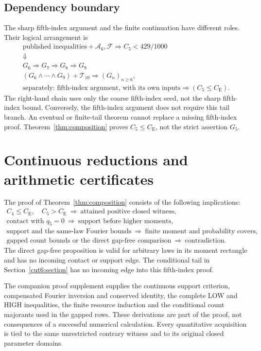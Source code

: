 \documentclass[11pt,a4paper]{article}
\theoremstyle{definition}
\newcommand{\CE}{C_{\mathrm E}}
\begin{document}
\subsection*{Dependency boundary}
The sharp fifth-index argument and the finite continuation have different
roles. Their logical arrangement is
\[
\begin{gathered}
\text{published inequalities}+\mathcal A_6,\mathcal F
 \Longrightarrow C_5<429/1000\\
\Downarrow\\[-2pt]
G_6\Longrightarrow G_7\Longrightarrow G_8\Longrightarrow G_9\\[3pt]
(G_6\wedge\cdots\wedge G_9)+\mathcal T_{10}
 \Longrightarrow (G_n)_{n\ge6},\\[3pt]
\text{separately: fifth-index argument, with its own inputs}
 \Longrightarrow (C_5\le\CE).
\end{gathered}
\]
The right-hand chain uses only the coarse fifth-index seed, not the sharp
fifth-index bound.
Conversely, the fifth-index argument does not require this tail branch.
An eventual or finite-tail theorem cannot replace a missing fifth-index
proof. Theorem~\ref{thm:composition} proves \(C_5\le\CE\), not
the strict assertion \(G_5\).


\section{Continuous reductions and arithmetic certificates}\label{sec:sources}
The proof of Theorem~\ref{thm:composition} consists of the following
implications:
\[
\begin{gathered}
 C_4\le\CE,\quad C_5>\CE
 \ \Longrightarrow\ \text{attained positive closed witness},\\
 \text{contact with }q_5=0
 \ \Longrightarrow\ \text{support before higher moments},\\
 \text{support and the same-law Fourier bounds}
 \ \Longrightarrow\ \text{finite moment and probability covers},\\
 \text{gapped count bounds or the direct gap-free comparison}
 \ \Longrightarrow\ \text{contradiction}.
\end{gathered}
\]
The direct gap-free proposition is valid for arbitrary laws in its
moment rectangle and has no incoming contact or support edge.
The conditional tail in Section~\ref{cut6:section} has no incoming edge
into this fifth-index proof.

The companion proof supplement \cite{C5ProofSupplement} supplies the
continuous support criterion, compensated Fourier inversion and
conserved identity, the complete LOW and HIGH inequalities, the finite
resource induction and the conditional count majorants used in the
gapped rows. These derivations are part of the proof, not consequences
of a successful numerical calculation. Every quantitative acquisition
is tied to the same unrestricted contrary witness and to its original
closed parameter domains.
\end{document}
